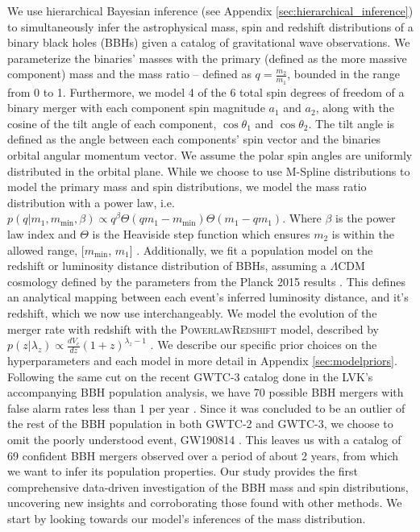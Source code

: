 We use hierarchical Bayesian inference (see Appendix \ref{sec:hierarchical_inference}) to simultaneously infer the astrophysical mass, spin and redshift distributions of 
a binary black holes (BBHs) given a catalog of gravitational wave observations. We parameterize the binaries' masses with the primary (defined as the more massive component) mass 
and the mass ratio -- defined as $q=\frac{m_2}{m_1}$, bounded in the range from 0 to 1. Furthermore, we model 4 of the 6 total 
spin degrees of freedom of a binary merger with each component spin magnitude $a_1$ and $a_2$, along with the cosine of the tilt angle of each component, 
$\cos{\theta_1}$ and $\cos{\theta_2}$. The tilt angle is defined as the angle between each components' spin vector and the binaries orbital angular momentum vector. 
We assume the polar spin angles are uniformly distributed in the orbital plane. While we choose to use M-Spline distributions to model the primary mass and spin distributions, we 
model the mass ratio distribution with a power law, i.e. $p(q | m_1, m_\mathrm{min}, \beta) \propto q^{\beta} \Theta(qm_1 - m_\mathrm{min}) \Theta(m_1 - qm_1)$. 
Where $\beta$ is the power law index and $\Theta$ is the Heaviside step function which ensures $m_2$ is within the allowed range, [$m_\mathrm{min}$, $m_1$] \citep{Talbot_2018,o1o2_pop,o3a_pop}.
Additionally, we fit a population model on the redshift or luminosity distance distribution of BBHs, assuming a $\Lambda\mathrm{CDM}$ cosmology defined by the parameters 
from the Planck 2015 results \citep{Planck2015}. This defines an analytical mapping between each event's inferred luminosity distance, and it's redshift, which we now use interchangeably. 
We model the evolution of the merger rate with redshift with the \textsc{PowerlawRedshift} model, described by $p(z|\lambda_z)\propto \frac{dV_c}{dz}(1+z)^{\lambda_z-1}$ \citep{Fishbach_2018redshift}. 
We describe our specific prior choices on the hyperparameters and each model in more detail in Appendix \ref{sec:modelpriors}. Following the same cut on the recent GWTC-3 catalog done in the LVK's 
accompanying BBH population analysis, we have 70 possible BBH mergers with false alarm rates less than 1 per year \citep{GWTC3,o3b_astro_dist}. Since it was concluded to be an outlier of the rest of 
the BBH population in both GWTC-2 and GWTC-3, we choose to omit the poorly understood event, GW190814 \citep{190814disc,o3a_pop,o3b_astro_dist,Essick_2022}. This leaves us with 
a catalog of 69 confident BBH mergers observed over a period of about 2 years, from which we want to infer its population properties. Our study provides the first comprehensive 
data-driven investigation of the BBH mass and spin distributions, uncovering new insights and corroborating those found with other methods. 
We start by looking towards our model's inferences of the mass distribution.


